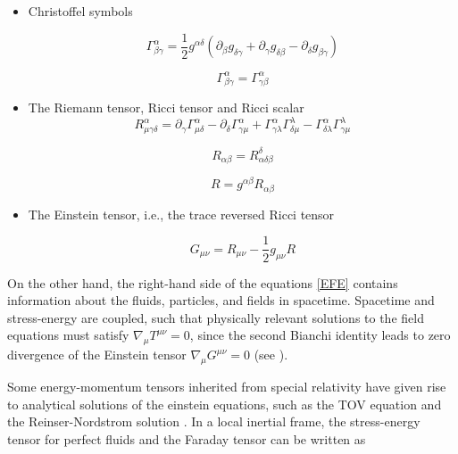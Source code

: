\begin{itemize}[leftmargin=*]
\item Christoffel symbols

\begin{equation}\label{christoffel}
\Gamma^{\alpha}_{\beta \gamma} = \frac{1}{2} g^{\alpha \delta}(\partial_{\beta} g_{\delta \gamma} + \partial_{\gamma} g_{\delta \beta} - \partial_{\delta} g_{\beta \gamma})
\end{equation}

\begin{equation}
\Gamma^{\alpha}_{\beta \gamma} = \Gamma^{\alpha}_{\gamma \beta}
\end{equation}


\item The Riemann tensor, Ricci tensor and Ricci scalar 
\begin{equation}\label{riemann}
R^{\alpha}_{\mu\gamma \delta} = \partial_{\gamma} \Gamma^{\alpha}_{\mu \delta} - \partial_{\delta} \Gamma^{\alpha}_{\gamma \mu} +  \Gamma^{\alpha}_{\gamma \lambda} \Gamma^{\lambda}_{\delta \mu} - \Gamma^{\alpha}_{\delta \lambda} \Gamma^{\lambda}_{\gamma \mu}
\end{equation}

\begin{equation}
R_{\alpha \beta}= R^{\delta}_{\alpha \delta \beta}
\end{equation}

\begin{equation}
R = g^{\alpha \beta}R_{\alpha \beta}
\end{equation}

\item The Einstein tensor, i.e., the trace reversed Ricci tensor

\begin{equation}
G_{\mu\nu} = R_{\mu\nu} - \frac{1}{2} g_{\mu\nu} R
\end{equation}


\end{itemize}

On the other hand, the right-hand side of the equations \ref{EFE} contains information about the fluids, particles, and fields in spacetime. Spacetime and stress-energy are coupled, such that physically relevant solutions to the field equations must satisfy $\nabla_{\mu} T^{\mu\nu} = 0$, since the second Bianchi identity leads to zero divergence of the Einstein tensor $\nabla_{\mu}G^{\mu\nu} = 0$ (see \cite{Weinberg:1972kfs}).

Some energy-momentum tensors inherited from special relativity have given rise to analytical solutions of the einstein equations, such as the TOV equation \cite{PhysRev.55.374} and the Reinser-Nordstrom solution \cite{https://doi.org/10.1002/andp.19163550905}. In a local inertial frame, the stress-energy tensor for perfect fluids and the Faraday tensor can be written as


